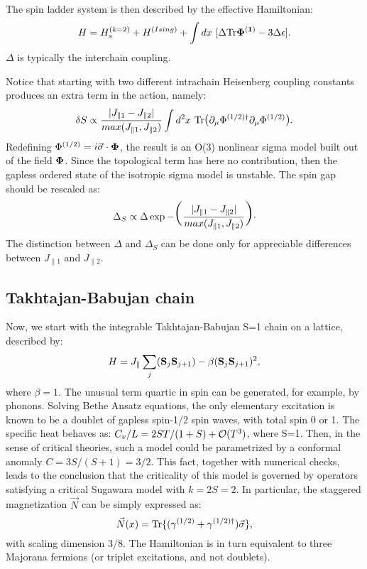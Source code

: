 The spin ladder system is then described by the effective 
Hamiltonian\cite{Totsuka-Suzuki}:
\begin{equation}
\label{C13}
H=H_s^{(k=2)}+H^{(Ising)}
+\int dx\ [\Delta\hbox{Tr}{\bf\Phi^{(1)}}-3\Delta\epsilon].
\end{equation}
$\Delta$ is typically the interchain coupling. 

Notice that starting with two
different intrachain Heisenberg coupling constants produces an extra term in
the action, namely:
\begin{equation}
\delta S\propto
\frac{|J_{\parallel 1}-J_{\parallel 2}|}{max(J_{\parallel 1},
J_{\parallel 2})} \int
d^2x\ \hbox{Tr}\hbox{\large(}
\partial_{\mu}\Phi^{(1/2)\dag}\partial_{\mu}\Phi^{(1/2)}\hbox{\large)}.
\end{equation}
Redefining $\Phi^{(1/2)}=i\vec{\sigma}\cdot{\bf\Phi}$, the result is an O(3)
nonlinear sigma model built out of the field ${\bf\Phi}$. Since the
topological term has here no contribution, then the gapless ordered
state of the isotropic sigma model is unstable. The spin gap should be
rescaled as:
\begin{equation}
\Delta_S\propto \Delta 
\exp-\hbox{\Huge(}\frac{|J_{\parallel 1}-J_{\parallel 2}|}{max(J_{\parallel 1},
J_{\parallel 2})}\hbox{\Huge)}\cdot
\end{equation}
The distinction between $\Delta$ and $\Delta_S$ can be done only for
appreciable differences between $J_{\parallel 1}$ and $J_{\parallel 2}$.

\subsection{Takhtajan-Babujan chain}

Now, we start with the integrable Takhtajan-Babujan S=1 chain on a lattice,
described by:
\begin{equation}
H=J_{\parallel}\sum_j ({\bf S}_j{\bf S}_{j+1})-
\beta({\bf S}_j{\bf S}_{j+1})^2,
\end{equation}
where $\beta=1$\cite{TB}. The unusual term quartic in spin 
can be generated, for 
example, by phonons. Solving Bethe Ansatz
equations, the only elementary excitation is known to be a doublet
of gapless spin-1/2 spin waves, with total spin 0 or 1. The specific
heat behaves as: $C_v/L=2S T/(1+S)+{\cal O}(T^3)$, where S=1. Then, in
the sense of critical theories, such a model could be parametrized by a 
conformal anomaly $C=3S/(S+1)=3/2$.
This fact, together with numerical checks, leads to
the conclusion that the criticality of this model is governed by operators
satisfying a 
critical Sugawara model with 
$k=2S=2$. In particular, the staggered
magnetization $\vec{N}$ can be simply 
expressed as:
\begin{equation}
\vec{N}(x)=
\hbox{Tr}\{({\gamma}^{(1/2)}+{\gamma}^{(1/2)\dag})\vec{\sigma}\},
\end{equation}
with scaling dimension 3/8. 
The Hamiltonian is in turn equivalent to three Majorana fermions (or
triplet excitations, and not doublets).

